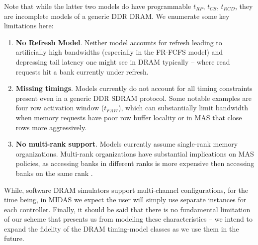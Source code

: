 Note that while the latter two models do have programmable $t_{RP}$, $t_{CS}$,
$t_{RCD}$, they are incomplete models of a generic DDR DRAM. We enumerate some
key limitations here:

\begin{enumerate}
    \item\textbf{No Refresh Model}. Neither model accounts for refresh leading to
        artificially high bandwidths (especially in the FR-FCFS model) and
        depressing tail latency one might see in DRAM typically -- where read
        requests hit a bank currently under refresh.

    \item\textbf{Missing timings}. Models currently do not account for all timing
        constraints present even in a generic DDR SDRAM protocol. Some notable
        examples are four row activation window ($t_{FAW}$), which can
        substantially limit bandwidth when memory requests have poor row buffer
        locality or in MAS that close rows more aggressively.

    \item\textbf{No multi-rank support}. Models currently assume single-rank
        memory organizations. Multi-rank organizations have substantial
        implications on MAS policies, as accessing banks in different ranks is
        more expensive then accessing banks on the same rank .

\end{enumerate}

While, software DRAM simulators support multi-channel configurations, for the
time being, in MIDAS we expect the user will simply use separate instances for
each controller.  Finally, it should be said that there is no fundamental
limitation of our scheme that presents us from modeling these characteristics
-- we intend to expand the fidelity of the DRAM timing-model classes as we use
them in the future.



